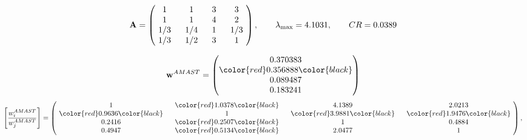 \begin{example}
\begin{equation*}
\mathbf{A} =
\begin{pmatrix}
$\,\,$ 1 $\,\,$ & $\,\,$1$\,\,$ & $\,\,$3$\,\,$ & $\,\,$3 $\,\,$ \\
$\,\,$ 1 $\,\,$ & $\,\,$ 1 $\,\,$ & $\,\,$4$\,\,$ & $\,\,$2 $\,\,$ \\
$\,\,$ 1/3$\,\,$ & $\,\,$ 1/4$\,\,$ & $\,\,$ 1 $\,\,$ & $\,\,$ 1/3 $\,\,$ \\
$\,\,$ 1/3$\,\,$ & $\,\,$ 1/2$\,\,$ & $\,\,$3$\,\,$ & $\,\,$ 1  $\,\,$ \\
\end{pmatrix},
\qquad
\lambda_{\max} =
4.1031,
\qquad
CR = 0.0389
\end{equation*}

\begin{equation*}
\mathbf{w}^{AMAST} =
\begin{pmatrix}
0.370383\\
\color{red} 0.356888\color{black} \\
0.089487\\
0.183241
\end{pmatrix}\end{equation*}
\begin{equation*}
\left[ \frac{{w}^{AMAST}_i}{{w}^{AMAST}_j} \right] =
\begin{pmatrix}
$\,\,$ 1 $\,\,$ & $\,\,$\color{red} 1.0378\color{black} $\,\,$ & $\,\,$4.1389$\,\,$ & $\,\,$2.0213$\,\,$ \\
$\,\,$\color{red} 0.9636\color{black} $\,\,$ & $\,\,$ 1 $\,\,$ & $\,\,$\color{red} 3.9881\color{black} $\,\,$ & $\,\,$\color{red} 1.9476\color{black}   $\,\,$ \\
$\,\,$0.2416$\,\,$ & $\,\,$\color{red} 0.2507\color{black} $\,\,$ & $\,\,$ 1 $\,\,$ & $\,\,$0.4884 $\,\,$ \\
$\,\,$0.4947$\,\,$ & $\,\,$\color{red} 0.5134\color{black} $\,\,$ & $\,\,$2.0477$\,\,$ & $\,\,$ 1  $\,\,$ \\
\end{pmatrix},
\end{equation*}


\end{example}
